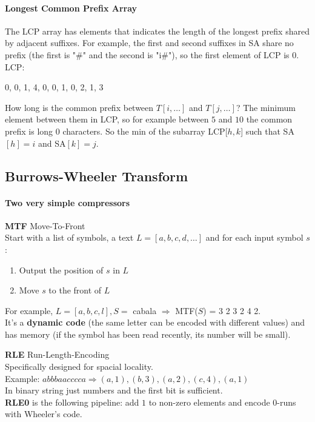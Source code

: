 \documentclass[10pt]{report}
\begin{document}
\paragraph{Longest Common Prefix Array} The LCP array has elements that indicates the length of the longest prefix shared by adjacent suffixes. For example, the first and second suffixes in SA share no prefix (the first is "\#" and the second is "i\#"), so the first element of LCP is 0. LCP:
\begin{list}{}{}
	\item 0, 0, 1, 4, 0, 0, 1, 0, 2, 1, 3
\end{list}
How long is the common prefix between $T[i,\ldots]$ and $T[j,\ldots]$? The minimum element between them in LCP, so for example between $5$ and $10$ the common prefix is long $0$ characters. So the min of the subarray LCP[$h,k$] such that SA$[h]=i$ and SA$[k]=j$.
\subsection{Burrows-Wheeler Transform}
\paragraph{Two very simple compressors}
\begin{list}{}{}
	\item \textbf{MTF} Move-To-Front\\
	Start with a list of symbols, a text $L=[a,b,c,d,\ldots]$ and for each input symbol $s$:
	\begin{enumerate}
		\item Output the position of $s$ in $L$
		\item Move $s$ to the front of $L$
	\end{enumerate}
	For example, $L=[a,b,c,l], S =$ cabala $\Rightarrow$ MTF($S$) = 3 2 3 2 4 2.\\
	It's a \textbf{dynamic code} (the same letter can be encoded with different values) and has memory (if the symbol has been read recently, its number will be small).
	\item \textbf{RLE} Run-Length-Encoding\\
	Specifically designed for spacial locality.\\
	Example: $abbbaacccca \Rightarrow (a,1),(b,3),(a,2),(c,4),(a,1)$\\
	In binary string just numbers and the first bit is sufficient.\\
	\textbf{RLE0} is the following pipeline: add $1$ to non-zero elements and encode 0-runs with Wheeler's code.
\end{list}
\end{document}
